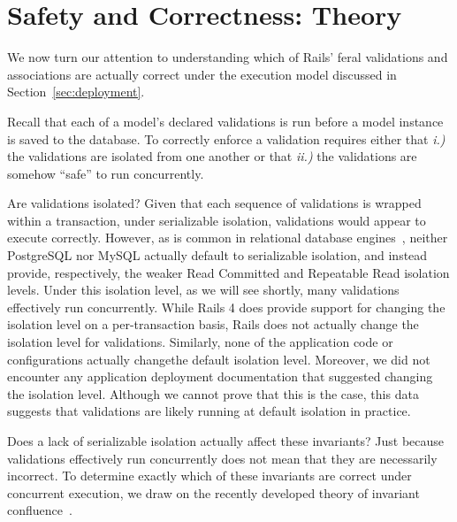 
\section{Safety and Correctness: Theory}
\label{sec:apps}

We now turn our attention to understanding which of Rails' feral
validations and associations are actually correct under the execution
model discussed in Section~\ref{sec:deployment}. 

Recall that each of a model's declared validations is run before a model instance is saved to
the database. To correctly enforce a validation requires either that
\textit{i.)} the validations are isolated from one another or
that \textit{ii.)} the validations are somehow ``safe'' to run
concurrently.

Are validations isolated? Given that each sequence of validations is
wrapped within a transaction, under serializable isolation,
validations would appear to execute correctly. However, as is common
in relational database engines~\cite{hat-vldb}, neither PostgreSQL nor
MySQL actually default to serializable isolation, and instead provide,
respectively, the weaker Read Committed and Repeatable Read isolation
levels. Under this isolation level, as we will see shortly, many
validations effectively run concurrently. While Rails 4 does provide
support for changing the isolation level on a per-transaction basis,
Rails does not actually change the isolation level for
validations. Similarly, none of the application code or configurations
actually changethe default isolation level. Moreover, we did not
encounter any application deployment documentation that suggested
changing the isolation level. Although we cannot prove that this is
the case, this data suggests that validations are likely running at
default isolation in practice.

Does a lack of serializable isolation actually affect these
invariants? Just because validations effectively run concurrently does
not mean that they are necessarily incorrect. To determine exactly
which of these invariants are correct under concurrent execution, we
draw on the recently developed theory of invariant
confluence~\cite{coord-avoid}.


